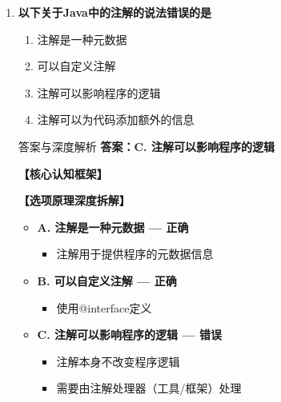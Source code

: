 \documentclass[12pt, a4paper]{ctexart}
\begin{document}
\begin{enumerate}[label=\textbf{\arabic*.}]
\begin{bluebox}{答案与深度解析}
\begin{itemize}[label={}, leftmargin=*, nosep]
\begin{itemize}[label={}, nosep]
		      

	      
					  \end{itemize}
					  \end{itemize}
\end{bluebox}

	      \vspace{1em}

	\item \textbf{以下关于Java中的注解的说法错误的是}
	      \begin{enumerate}[label=\Alph*.]
		      \item 注解是一种元数据
		      \item 可以自定义注解
		      \item 注解可以影响程序的逻辑
		      \item 注解可以为代码添加额外的信息
	      \end{enumerate}

	      \begin{bluebox}{答案与深度解析}
		      \textbf{答案：C. 注解可以影响程序的逻辑}

		      \textbf{【核心认知框架】}

		      \textbf{【选项原理深度拆解】}
					  \begin{itemize}[label={}, leftmargin=*, nosep]


		      \item \textbf{A. 注解是一种元数据 — 正确}
					  \begin{itemize}[label={}, nosep]
		      
			      \item 注解用于提供程序的元数据信息

					  \end{itemize}
		      \item \textbf{B. 可以自定义注解 — 正确}
					  \begin{itemize}[label={}, nosep]
		      
			      \item 使用@interface定义
		      

					  \end{itemize}
		      \item \textbf{C. 注解可以影响程序的逻辑 — 错误}
					  \begin{itemize}[label={}, nosep]
		      
			      \item 注解本身不改变程序逻辑
			      \item 需要由注解处理器（工具/框架）处理
		      


\end{itemize}
\end{itemize}
\end{bluebox}
\end{enumerate}
\end{document}
